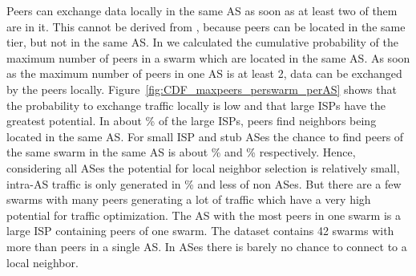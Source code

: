 


Peers can exchange data locally in the same AS as soon as at least two of them are in it. This cannot be derived from , because peers can be located in the same tier, but not in the same AS.
In  we calculated the cumulative probability of the maximum number of peers in a swarm which are located in the same AS. As soon as the maximum number of peers in one AS is at least 2, data can be exchanged by the peers locally. Figure~\ref{fig:CDF_maxpeers_perswarm_perAS} shows that the probability to exchange traffic locally is low and that large ISPs have the greatest potential. In about \unit[15]{\%} of the large ISPs, peers find neighbors being located in the same AS. For small ISP and stub ASes the chance to find peers of the same swarm in the same AS is about \unit[10]{\%} and \unit[12]{\%} respectively. Hence, considering all ASes the potential for local neighbor selection is relatively small, intra-AS traffic is only generated in \unit[15]{\%} and less of non \tier ASes. But there are a few swarms with many peers generating a lot of traffic which have a very high potential for traffic optimization. The AS with the most peers in one swarm is a large ISP containing  peers of one swarm. The dataset contains 42 swarms with more than  peers in a single AS.
In \tier ASes there is barely no chance to connect to a local neighbor.

